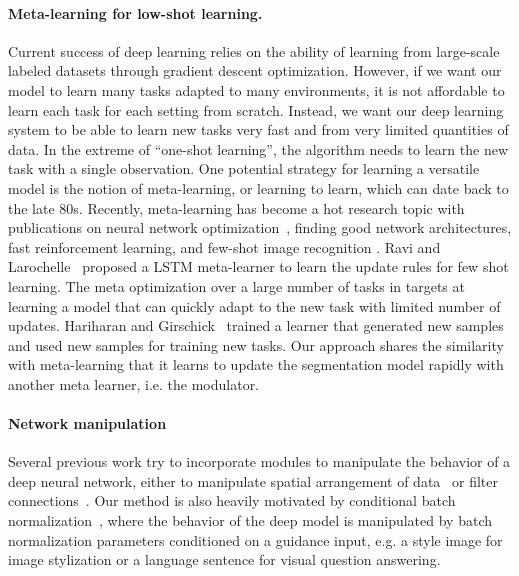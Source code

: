 \documentclass[10pt,twocolumn,letterpaper]{article}
\begin{document}
\paragraph{Meta-learning for low-shot learning.} Current success of deep learning relies on the ability of learning from large-scale labeled datasets through gradient descent optimization. However, if we want our model to learn many tasks adapted to many environments, it is not affordable to learn each task for each setting from scratch. Instead, we want our deep learning system to be able to learn new tasks very fast and from very limited quantities of data. In the extreme of ``one-shot learning'', the algorithm needs to learn the new task with a single observation. One potential strategy for learning a versatile model is the notion of meta-learning, or learning to learn, which can date back to the late 80s. Recently, meta-learning has become a hot research topic with publications on neural network optimization~\cite{Chen2017LearningToLearn}, finding good network architectures, fast reinforcement learning, and few-shot image recognition \cite{Vinyals2016Matching,Ravi2016optimization,Hariharan2017ICCV,Finn2017ICML,Santoro2016ICML}. Ravi and Larochelle~\cite{Ravi2016optimization} proposed a LSTM meta-learner to learn the update rules for few shot learning. The meta optimization over a large number of tasks in \cite{Finn2017ICML} targets at learning a model that can quickly adapt to the new task with limited number of updates. Hariharan and Girschick~\cite{Hariharan2017ICCV} trained a learner that generated new samples and used new samples for training new tasks. Our approach shares the similarity with meta-learning that it learns to update the segmentation model rapidly with another meta learner, i.e. the modulator. 

\paragraph{Network manipulation}
Several previous work try to incorporate modules to manipulate the behavior of a deep neural network, either to manipulate spatial arrangement of data~\cite{Jaderberg2015spatial} or filter connections~\cite{Dai2017deformable}. Our method is also heavily motivated by conditional batch normalization~\cite{Dumoulin2017ICLR,Ghiasi2017BMVC,Huang2017ArbitraryST,Perez2017LearningVR}, where the behavior of the deep model is manipulated by batch normalization parameters conditioned on a guidance input, e.g. a style image for image stylization or a language sentence for visual question answering. 
\end{document}

